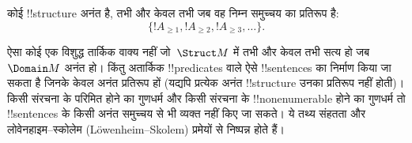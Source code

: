 \documentclass[../../../include/open-logic-section]{subfiles}
\begin{document}
\begin{prop}
कोई !!{structure} अनंत है, तभी और केवल तभी जब वह निम्न समुच्चय का प्रतिरूप है:
\[
\{!A_{\ge 1}, !A_{\ge 2}, !A_{\ge 3}, \dots \}.
\]
\end{prop}

ऐसा कोई एक विशुद्ध तार्किक वाक्य नहीं जो~$\Struct
M$ में तभी और केवल तभी सत्य
हो जब~$\Domain M$ अनंत हो। किंतु अतार्किक !!{predicate}s वाले ऐसे
!!{sentence}s का निर्माण किया जा सकता है जिनके केवल अनंत प्रतिरूप हों (यद्यपि प्रत्येक
अनंत !!{structure} उनका प्रतिरूप नहीं होती)। किसी संरचना के परिमित होने का
गुणधर्म और किसी संरचना के !!{nonenumerable} होने का गुणधर्म तो !!{sentence}s
के किसी अनंत समुच्चय से भी व्यक्त नहीं किए जा सकते। ये तथ्य संहतता और
लोवेनहाइम--स्कोलेम (L\"owenheim--Skolem) प्रमेयों से निष्पन्न होते हैं।
\end{document}
